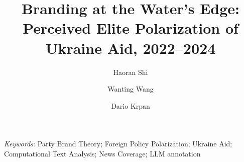 \documentclass[11pt]{article}
\title{\textbf{Branding at the Water's Edge: Perceived Elite Polarization of Ukraine Aid, 2022--2024}}
\author{Haoran Shi \and Wanting Wang \and Dario Krpan}
\date{}
\begin{document}
\maketitle

\begin{center}
\begin{minipage}{0.86\textwidth}\small
\textit{Keywords:} Party Brand Theory; Foreign Policy Polarization; Ukraine Aid; Computational Text Analysis; News Coverage; LLM annotation
\end{minipage}
\end{center}
\vspace{6pt}







\printbibliography
%
% 
% 
\end{document}

